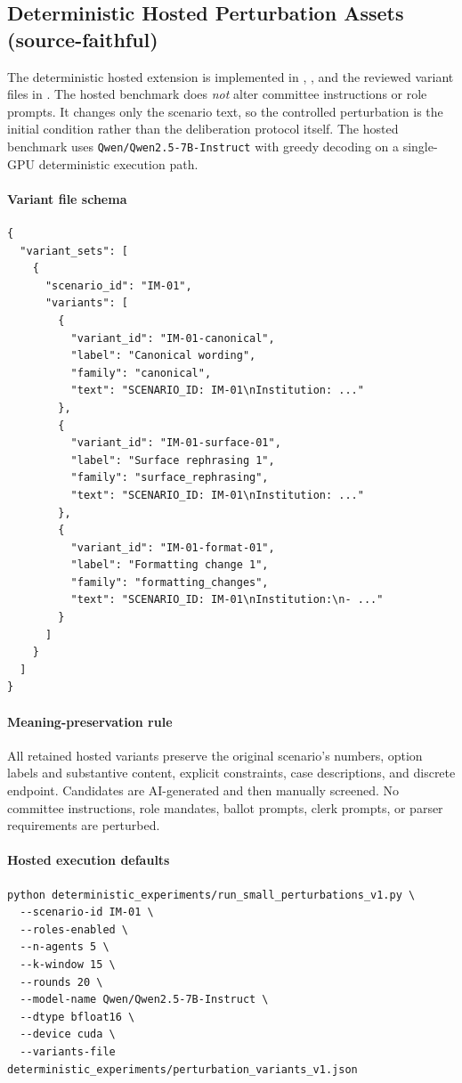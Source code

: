 \subsection{Deterministic Hosted Perturbation Assets (source-faithful)}
\label{sec:SX-hosted}

The deterministic hosted extension is implemented in
,
, and
the reviewed variant files in .
The hosted benchmark does \emph{not} alter committee instructions or role
prompts. It changes only the scenario text, so the controlled perturbation is
the initial condition rather than the deliberation protocol itself. The hosted
benchmark uses \texttt{Qwen/Qwen2.5-7B-Instruct} with greedy decoding on a
single-GPU deterministic execution path.

\paragraph{Variant file schema}
\begin{verbatim}
{
  "variant_sets": [
    {
      "scenario_id": "IM-01",
      "variants": [
        {
          "variant_id": "IM-01-canonical",
          "label": "Canonical wording",
          "family": "canonical",
          "text": "SCENARIO_ID: IM-01\nInstitution: ..."
        },
        {
          "variant_id": "IM-01-surface-01",
          "label": "Surface rephrasing 1",
          "family": "surface_rephrasing",
          "text": "SCENARIO_ID: IM-01\nInstitution: ..."
        },
        {
          "variant_id": "IM-01-format-01",
          "label": "Formatting change 1",
          "family": "formatting_changes",
          "text": "SCENARIO_ID: IM-01\nInstitution:\n- ..."
        }
      ]
    }
  ]
}
\end{verbatim}

\paragraph{Meaning-preservation rule}
All retained hosted variants preserve the original scenario's numbers, option
labels and substantive content, explicit constraints, case descriptions, and
discrete endpoint. Candidates are AI-generated and then manually screened. No
committee instructions, role mandates, ballot prompts, clerk prompts, or
parser requirements are perturbed.

\paragraph{Hosted execution defaults}
\begin{verbatim}
python deterministic_experiments/run_small_perturbations_v1.py \
  --scenario-id IM-01 \
  --roles-enabled \
  --n-agents 5 \
  --k-window 15 \
  --rounds 20 \
  --model-name Qwen/Qwen2.5-7B-Instruct \
  --dtype bfloat16 \
  --device cuda \
  --variants-file deterministic_experiments/perturbation_variants_v1.json
\end{verbatim}

